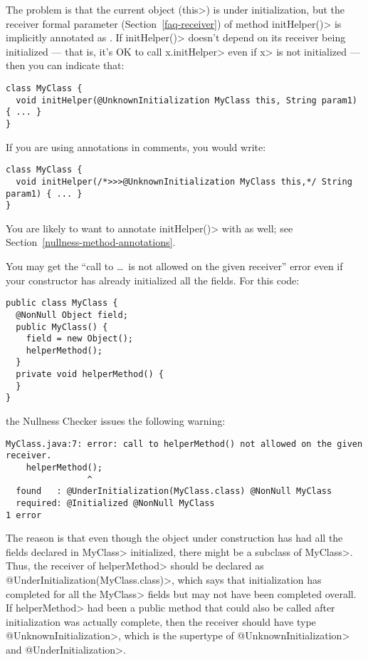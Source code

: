 The problem is that the current object (\<this>) is under initialization,
but the receiver formal parameter (Section~\ref{faq-receiver}) of method
\<initHelper()> is implicitly annotated as
.  If
\<initHelper()> doesn't depend on its receiver being initialized --- that
is, it's OK to call \<x.initHelper> even if \<x> is not initialized ---
then you can indicate that:

\begin{Verbatim}
class MyClass {
  void initHelper(@UnknownInitialization MyClass this, String param1) { ... }
}
\end{Verbatim}

\noindent
If you are using annotations in comments, you would write:

\begin{Verbatim}
class MyClass {
  void initHelper(/*>>>@UnknownInitialization MyClass this,*/ String param1) { ... }
}
\end{Verbatim}

\noindent
You are likely to want to annotate \<initHelper()> with
 as well; see
Section~\ref{nullness-method-annotations}.


You may get the ``call to \ldots\ is not allowed on the given receiver''
error even if your constructor has already initialized all the fields.
For this code:

\begin{Verbatim}
public class MyClass {
  @NonNull Object field;
  public MyClass() {
    field = new Object();
    helperMethod();
  }
  private void helperMethod() {
  }
}
\end{Verbatim}

\noindent
the Nullness Checker issues the following warning:

\begin{Verbatim}
MyClass.java:7: error: call to helperMethod() not allowed on the given receiver.
    helperMethod();
                ^
  found   : @UnderInitialization(MyClass.class) @NonNull MyClass
  required: @Initialized @NonNull MyClass
1 error
\end{Verbatim}

\begin{sloppypar}
The reason is that even though the object under construction has had all
the fields declared in \<MyClass> initialized, there might be a subclass of
\<MyClass>.  Thus, the receiver of \<helperMethod> should be declared as
\<@UnderInitialization(MyClass.class)>, which says that initialization has
completed for all the \<MyClass> fields but may not have been completed
overall.  If \<helperMethod> had been a public method that could also be called after
initialization was actually complete, then the receiver should have type
\<@UnknownInitialization>, which is the supertype of
\<@UnknownInitialization> and \<@UnderInitialization>.
\end{sloppypar}


